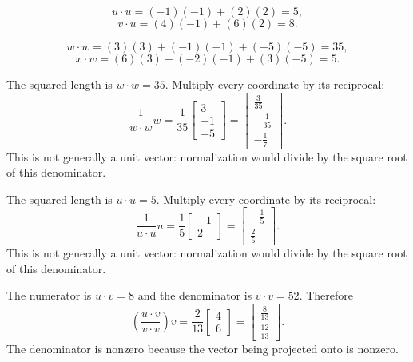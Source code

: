 \[u\cdot u=(-1)(-1)+(2)(2)=5,\]
\[v\cdot u=(4)(-1)+(6)(2)=8.\]

\[w\cdot w=(3)(3)+(-1)(-1)+(-5)(-5)=35,\]
\[x\cdot w=(6)(3)+(-2)(-1)+(3)(-5)=5.\]

The squared length is $w\cdot w=35$. Multiply every coordinate by its reciprocal:
\[\frac1{w\cdot w}w=\frac{1}{35}\left[\begin{array}{r}3\\-1\\-5\end{array}\right]=\left[\begin{array}{r}\frac{3}{35}\\- \frac{1}{35}\\- \frac{1}{7}\end{array}\right].\]
This is not generally a unit vector: normalization would divide by the square root of this denominator.

The squared length is $u\cdot u=5$. Multiply every coordinate by its reciprocal:
\[\frac1{u\cdot u}u=\frac{1}{5}\left[\begin{array}{r}-1\\2\end{array}\right]=\left[\begin{array}{r}- \frac{1}{5}\\\frac{2}{5}\end{array}\right].\]
This is not generally a unit vector: normalization would divide by the square root of this denominator.

The numerator is $u\cdot v=8$ and the denominator is $v\cdot v=52$. Therefore
\[\left(\frac{u\cdot v}{v\cdot v}\right)v=\frac{2}{13}\left[\begin{array}{r}4\\6\end{array}\right]=\left[\begin{array}{r}\frac{8}{13}\\\frac{12}{13}\end{array}\right].\]
The denominator is nonzero because the vector being projected onto is nonzero.

